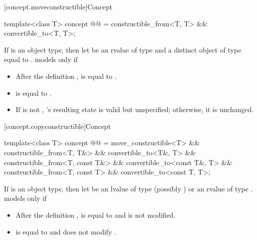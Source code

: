 [concept.moveconstructible]{Concept }

\begin{itemdecl}
template<class T>
  concept @@ = constructible_from<T, T> && convertible_to<T, T>;
\end{itemdecl}

\begin{itemdescr}
\pnum
If  is an object type, then let  be an rvalue of type
 and  a distinct object of type  equal to
.  models  only if

\begin{itemize}
\item After the definition ,  is equal to .

\item {} is equal to .

\item If  is not , 's resulting state is valid
but unspecified; otherwise, it is unchanged.
\end{itemize}
\end{itemdescr}

[concept.copyconstructible]{Concept }

\begin{itemdecl}
template<class T>
  concept @@ =
    move_constructible<T> &&
    constructible_from<T, T&> && convertible_to<T&, T> &&
    constructible_from<T, const T&> && convertible_to<const T&, T> &&
    constructible_from<T, const T> && convertible_to<const T, T>;
\end{itemdecl}

\begin{itemdescr}
\pnum
If  is an object type, then let  be an lvalue of type
(possibly )  or an rvalue of type .
 models  only if

\begin{itemize}
\item After the definition ,
 is equal to  and
 is not modified.

\item {} is equal to  and does not modify .
\end{itemize}

\end{itemdescr}


